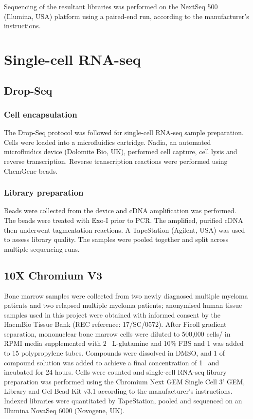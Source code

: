 Sequencing of the resultant libraries was performed on the NextSeq 500 (Illumina, USA) platform using a paired-end run, according to the manufacturer's instructions.

\section{Single-cell RNA-seq}
\subsection{Drop-Seq}

\subsubsection{Cell encapsulation}
The Drop-Seq protocol\cite{macosko2015highly} was followed for single-cell RNA-seq sample preparation.
Cells were loaded into a microfluidics cartridge.
Nadia, an automated microfluidics device (Dolomite Bio, UK), performed cell capture, cell lysis and reverse transcription.
Reverse transcription reactions were performed using ChemGene beads.

\subsubsection{Library preparation}
Beads were collected from the device and cDNA amplification was performed.
The beads were treated with Exo-I prior to PCR.
The amplified, purified cDNA then underwent tagmentation reactions.
A TapeStation (Agilent, USA) was used to assess library quality.
The samples were pooled together and split across multiple sequencing runs.

\subsection{10X Chromium V3}\label{subsec:10x_method}
Bone marrow samples were collected from two newly diagnosed multiple myeloma patients and two relapsed multiple myeloma patients;
anonymised human tissue samples used in this project were obtained with informed consent by the HaemBio Tissue Bank (REC reference: 17/SC/0572).
After Ficoll gradient separation, mononuclear bone marrow cells were diluted to 500,000 cells/\ml{} in RPMI media supplemented with 2\si{\milli\Molar}
L-glutamine and 10\% FBS and 1\ml{} was added to 15\ml{} polypropylene tubes.
Compounds were dissolved in DMSO, and 1\ul{} of compound solution was added to achieve a final concentration of 1\si{\micro\Molar} and incubated for 24 hours.
Cells were counted and single-cell RNA-seq library preparation was performed using the Chromium Next GEM Single Cell 3' GEM, Library and Gel Bead Kit v3.1 according to the manufacturer's instructions.
Indexed libraries were quantitated by TapeStation, pooled and sequenced on an Illumina NovaSeq 6000 (Novogene, UK).

